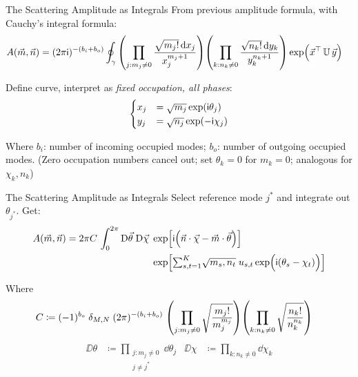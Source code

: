 \begin{frame}{The Scattering Amplitude as Integrals}
%
From previous amplitude formula, with Cauchy's integral formula:
\begin{align*}
	A(\vec{m}, \vec{n})
&=
	(2\pi\mathsf{i})^{-(b_i + b_o)}
	\oint_{\gamma}
		\qty( \prod_{j : m_j \neq 0}
			\frac
				{\sqrt{m_j!} \dd{x_j}}
				{x_j^{m_j+1}}
		)
		\qty( \prod_{k : n_k \neq 0}
			\frac
				{\sqrt{n_k!} \dd{y_k}}
				{ y_k^{n_k+1} }
		)
		\exp( \Big. \vec{x}^\top \, \mathbb{U} \, \vec{y})
\end{align*}

Define curve, interpret as \emph{fixed occupation, all phases}:
\begin{align*}
	\begin{cases}
	x_j &= \sqrt{m_j} \exp( \mathsf{i} \theta_j) \\
	y_j &= \sqrt{n_j} \exp(-\mathsf{i} \chi  _j)
	\end{cases}
\end{align*}

Where $b_i$: number of incoming occupied modes; $b_o$: number of outgoing occupied modes.
(Zero occupation numbers cancel out; set $\theta_k = 0$ for $m_k = 0$; analogous for $\chi_k, n_k$)
%
\end{frame}


\begin{frame}{The Scattering Amplitude as Integrals}
%
Select reference mode $j^*$ and integrate out $\theta_{j^*}$. Get:
\begin{align*}
	A(\vec{m}, \vec{n})
=
	2\pi C \,
	\int_{0}^{2\pi}
		\text{D}\vec{\theta}\; \text{D}\vec{\chi}\;
	&\exp[
		\mathsf{i} \qty(
			\vec{n} \cdot \vec{\chi}
			-
			\vec{m} \cdot \vec{\theta}
		)]
\\
	&\exp[
		{\textstyle \sum_{s,t=1}^{K} }
			\sqrt{m_s, n_t} \;
			u_{s,t}
			\exp(\Big. \mathsf{i}(\theta_s - \chi_t) )
	]
\end{align*}

Where
\begin{align*}
	C
&\coloneqq
	(-1)^{b_o} \;
	\delta_{M,N} \;
	(2\pi)^{-(b_i + b_o)} \;
	\qty( \prod_{j : m_j \neq 0}
		\sqrt{\frac
			{ m_j! }
			{ m_j^{m_j} }
		}
	)
	\qty( \prod_{k : n_k \neq 0}
		\sqrt{\frac
			{ n_k! }
			{ n_k^{n_k} }
		}
	)
\end{align*}
\begin{align*}
	\DD{\theta}
&\coloneqq
	\prod_{\substack{j : m_j \neq 0 \\ j \neq j^*}}
		\dd{\theta_j}
&
	\DD{\chi}
&\coloneqq
	\prod_{k : n_k \neq 0}
		\dd{\chi  _k}
\end{align*}
%
\end{frame}

